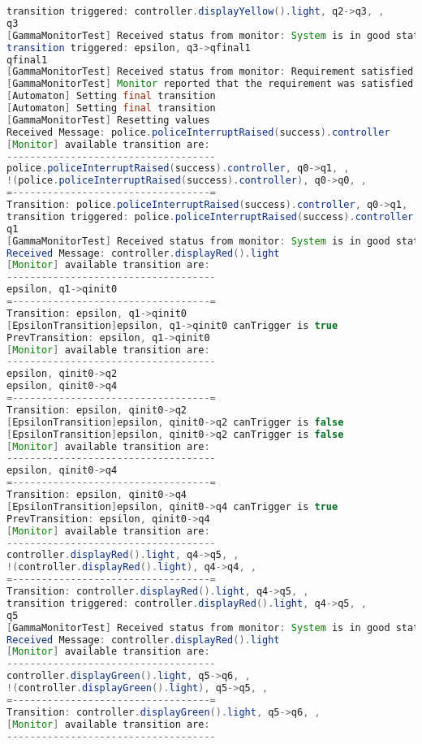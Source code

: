 \begin{lstlisting}[language=java, frame=single, float=ht!, caption={Szenárió szöveges leírása.},captionpos=b]
transition triggered: controller.displayYellow().light, q2->q3, ,
q3
[GammaMonitorTest] Received status from monitor: System is in good state.
transition triggered: epsilon, q3->qfinal1
qfinal1
[GammaMonitorTest] Received status from monitor: Requirement satisfied
[GammaMonitorTest] Monitor reported that the requirement was satisfied
[Automaton] Setting final transition
[Automaton] Setting final transition
[GammaMonitorTest] Resetting values
Received Message: police.policeInterruptRaised(success).controller
[Monitor] available transition are:
------------------------------------
police.policeInterruptRaised(success).controller, q0->q1, ,
!(police.policeInterruptRaised(success).controller), q0->q0, ,
=----------------------------------=
Transition: police.policeInterruptRaised(success).controller, q0->q1, ,
transition triggered: police.policeInterruptRaised(success).controller, q0->q1, ,
q1
[GammaMonitorTest] Received status from monitor: System is in good state.
Received Message: controller.displayRed().light
[Monitor] available transition are:
------------------------------------
epsilon, q1->qinit0
=----------------------------------=
Transition: epsilon, q1->qinit0
[EpsilonTransition]epsilon, q1->qinit0 canTrigger is true
PrevTransition: epsilon, q1->qinit0
[Monitor] available transition are:
------------------------------------
epsilon, qinit0->q2
epsilon, qinit0->q4
=----------------------------------=
Transition: epsilon, qinit0->q2
[EpsilonTransition]epsilon, qinit0->q2 canTrigger is false
[EpsilonTransition]epsilon, qinit0->q2 canTrigger is false
[Monitor] available transition are:
------------------------------------
epsilon, qinit0->q4
=----------------------------------=
Transition: epsilon, qinit0->q4
[EpsilonTransition]epsilon, qinit0->q4 canTrigger is true
PrevTransition: epsilon, qinit0->q4
[Monitor] available transition are:
------------------------------------
controller.displayRed().light, q4->q5, ,
!(controller.displayRed().light), q4->q4, ,
=----------------------------------=
Transition: controller.displayRed().light, q4->q5, ,
transition triggered: controller.displayRed().light, q4->q5, ,
q5
[GammaMonitorTest] Received status from monitor: System is in good state.
Received Message: controller.displayRed().light
[Monitor] available transition are:
------------------------------------
controller.displayGreen().light, q5->q6, ,
!(controller.displayGreen().light), q5->q5, ,
=----------------------------------=
Transition: controller.displayGreen().light, q5->q6, ,
[Monitor] available transition are:
------------------------------------

\end{lstlisting}
